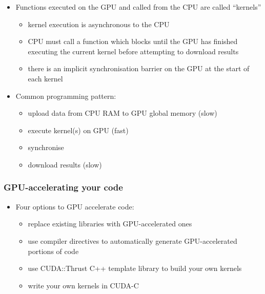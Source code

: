 \begin{itemize}
\itemsep1pt\parskip0pt
\item
  Functions executed on the GPU and called from the CPU are called
  ``kernels''

  \begin{itemize}
  \itemsep1pt\parskip0pt
  \item
    kernel execution is asynchronous to the CPU
  \item
    CPU must call a function which blocks until the GPU has finished
    executing the current kernel before attempting to download results
  \item
    there is an implicit synchronisation barrier on the GPU at the start
    of each kernel
  \end{itemize}
\item
  Common programming pattern:

  \begin{itemize}
  \itemsep1pt\parskip0pt
  \item
    upload data from CPU RAM to GPU global memory (slow)
  \item
    execute kernel(s) on GPU (fast)
  \item
    synchronise
  \item
    download results (slow)
  \end{itemize}
\end{itemize}

\subsubsection{GPU-accelerating your
code}\label{gpu-accelerating-your-code}

\begin{itemize}
\itemsep1pt\parskip0pt
\item
  Four options to GPU accelerate code:

  \begin{itemize}
  \itemsep1pt\parskip0pt
  \item
    replace existing libraries with GPU-accelerated ones
  \item
    use compiler directives to automatically generate GPU-accelerated
    portions of code
  \item
    use CUDA::Thrust C++ template library to build your own kernels
  \item
    write your own kernels in CUDA-C
  \end{itemize}
\end{itemize}


